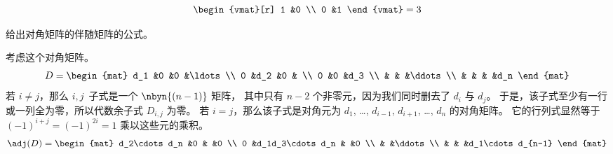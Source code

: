 \begin{exercises}
\begin{answer}
\begin{equation*}
\begin{vmat}[r]
               1  &0  \\
               0  &1
             \end{vmat}=3
      \end{equation*}  
    \end{answer}
  \item 
    给出对角矩阵的伴随矩阵的公式。
    \begin{answer}
      考虑这个对角矩阵。
      \begin{equation*}
        D=
        \begin{mat}
          d_1  &0   &0   &\ldots    \\
          0    &d_2 &0   &          \\
          0    &0   &d_3            \\
               &    &    &\ddots    \\
               &    &    &      &d_n   
        \end{mat}
      \end{equation*}
      若 $i\neq j$，那么 $i,j$~子式是一个 $\nbyn{(n-1)}$ 矩阵，
      其中只有 $n-2$ 个非零元，因为我们同时删去了 $d_i$ 与 $d_j$。
      于是，该子式至少有一行或一列全为零，所以代数余子式 $D_{i,j}$ 为零。
      若 $i=j$，那么该子式是对角元为
      $d_1$, \ldots, $d_{i-1}$, $d_{i+1}$, \ldots, $d_n$ 的对角矩阵。
      它的行列式显然等于 $(-1)^{i+j}=(-1)^{2i}=1$ 
      乘以这些元的乘积。
      \begin{equation*}
        \adj(D)
        =
        \begin{mat}
          d_2\cdots d_n    &0                 &      &0    \\
          0                &d_1d_3\cdots d_n  &      &0    \\
                           &                  &\ddots      \\
                           &                  &       &d_1\cdots d_{n-1} 
        \end{mat}
      \end{equation*}


\end{answer}
\end{exercises}
